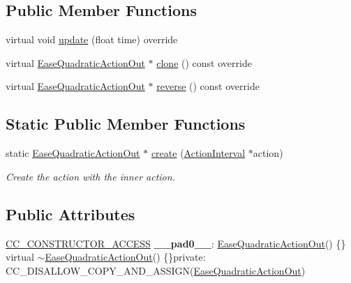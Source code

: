 \subsection*{Public Member Functions}
\begin{DoxyCompactItemize}
\item 
virtual void \hyperlink{classEaseQuadraticActionOut_afa53b3044fab72ac2ad29a6c2a4b2a24}{update} (float time) override
\item 
virtual \hyperlink{classEaseQuadraticActionOut}{Ease\+Quadratic\+Action\+Out} $\ast$ \hyperlink{classEaseQuadraticActionOut_a9621d836369fbaafdc3fda28846fe191}{clone} () const override
\item 
virtual \hyperlink{classEaseQuadraticActionOut}{Ease\+Quadratic\+Action\+Out} $\ast$ \hyperlink{classEaseQuadraticActionOut_ab7d8416ee33216c79f39beb9e775854c}{reverse} () const override
\end{DoxyCompactItemize}
\subsection*{Static Public Member Functions}
\begin{DoxyCompactItemize}
\item 
static \hyperlink{classEaseQuadraticActionOut}{Ease\+Quadratic\+Action\+Out} $\ast$ \hyperlink{classEaseQuadraticActionOut_a7e02c086ce740866ca9f5dadd0882ed5}{create} (\hyperlink{classActionInterval}{Action\+Interval} $\ast$action)
\begin{DoxyCompactList}\small\item\em Create the action with the inner action. \end{DoxyCompactList}\end{DoxyCompactItemize}
\subsection*{Public Attributes}
\begin{DoxyCompactItemize}
\item 
\mbox{\label{classEaseQuadraticActionOut_a09366fa584744a99298f58732331acb8}} 
\hyperlink{_2cocos2d_2cocos_2base_2ccConfig_8h_a25ef1314f97c35a2ed3d029b0ead6da0}{C\+C\+\_\+\+C\+O\+N\+S\+T\+R\+U\+C\+T\+O\+R\+\_\+\+A\+C\+C\+E\+SS} {\bfseries \+\_\+\+\_\+pad0\+\_\+\+\_\+}\+: \hyperlink{classEaseQuadraticActionOut}{Ease\+Quadratic\+Action\+Out}() \{\} virtual $\sim$\hyperlink{classEaseQuadraticActionOut}{Ease\+Quadratic\+Action\+Out}() \{\}private\+: C\+C\+\_\+\+D\+I\+S\+A\+L\+L\+O\+W\+\_\+\+C\+O\+P\+Y\+\_\+\+A\+N\+D\+\_\+\+A\+S\+S\+I\+GN(\hyperlink{classEaseQuadraticActionOut}{Ease\+Quadratic\+Action\+Out})
\end{DoxyCompactItemize}
